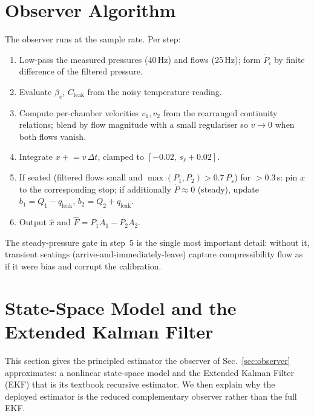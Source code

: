 \section{Observer Algorithm}\label{app:obs}
The observer runs at the sample rate. Per step:
\begin{enumerate}
\item Low-pass the measured pressures (40\,Hz) and flows (25\,Hz); form
$\dot{P}_i$ by finite difference of the filtered pressure.
\item Evaluate $\beta_e$, $C_{\text{leak}}$ from the noisy temperature reading.
\item Compute per-chamber velocities $v_1,v_2$ from the rearranged continuity
relations; blend by flow magnitude with a small regulariser so $v\to 0$ when both
flows vanish.
\item Integrate $x \mathrel{+}= v\,\Delta t$, clamped to $[{-}0.02,\,s_\ell{+}0.02]$.
\item If seated (filtered flows small and $\max(P_1,P_2)>0.7\,P_s$) for $>0.3$\,s:
pin $x$ to the corresponding stop; if additionally $\dot P\approx0$ (steady),
update $b_1=Q_1-q_{\text{leak}}$, $b_2=Q_2+q_{\text{leak}}$.
\item Output $\hat{x}$ and $\hat{F}=P_1 A_1-P_2 A_2$.
\end{enumerate}
The steady-pressure gate in step~5 is the single most important detail: without
it, transient seatings (arrive-and-immediately-leave) capture compressibility
flow as if it were bias and corrupt the calibration.

\section{State-Space Model and the Extended Kalman Filter}\label{app:ekf}
This section gives the principled estimator the observer of Sec.~\ref{sec:observer}
approximates: a nonlinear state-space model and the Extended Kalman Filter (EKF)
that is its textbook recursive estimator. We then explain why the deployed
estimator is the reduced complementary observer rather than the full EKF.


